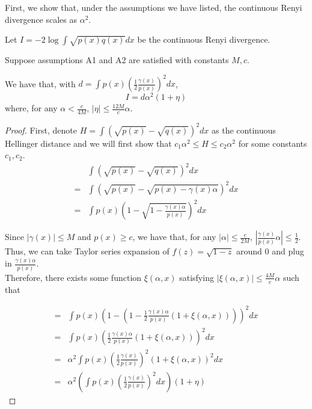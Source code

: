 \documentclass{article}
\begin{document}
First, we show that, under the assumptions we have listed, the continuous Renyi divergence scales as $\alpha^2$. 

\begin{proposition}
\label{prop:continuous_renyi_order}
Let $I = -2 \log \int \sqrt{p(x)q(x)} dx$ be the continuous Renyi divergence.

Suppose assumptions A1 and A2 are satisfied with constants $M, c$. 

We have that, with $d = \int p(x) \left( \frac{1}{2} \frac{\gamma(x)}{p(x)} \right)^2 dx$,
\[
I = d \alpha^2 ( 1 + \eta )
\]
where, for any $\alpha < \frac{c}{4M}$, $|\eta| \leq \frac{12 M}{c} \alpha$. 

\end{proposition}

\begin{proof}

First, denote $H = \int (\sqrt{p(x)} - \sqrt{q(x)})^2 dx$ as the continuous Hellinger distance and we will first show that $c_1 \alpha^2 \leq H \leq c_2 \alpha^2$ for some constants $c_1, c_2$.\\

\begin{align*}
&\int (\sqrt{p(x)} - \sqrt{q(x)})^2 dx \\
=& \int ( \sqrt{p(x)} - \sqrt{p(x) - \gamma(x) \alpha} )^2 dx \\
=& \int p(x) \left( 1 - \sqrt{ 1 - \frac{\gamma(x) \alpha}{p(x)}} \right)^2 dx 
\end{align*}

Since $|\gamma(x)| \leq M$ and $p(x) \geq c$, we have that, for any $|\alpha| \leq \frac{c}{2M}$, $\left| \frac{\gamma(x)}{p(x)} \alpha \right| \leq \frac{1}{2}$. Thus, we can take Taylor series expansion of $f(z) = \sqrt{1 - z}$ around 0 and plug in $\frac{\gamma(x) \alpha}{p(x)}$. \\


Therefore, there exists some function $\xi(\alpha, x)$ satisfying $|\xi(\alpha, x)| \leq 
\frac{4M}{c} \alpha$ such that

\begin{align*}
=& \int p(x) \left( 1 - (1 - \frac{1}{2} \frac{\gamma(x) \alpha}{p(x)} (1 + \xi(\alpha, x)) ) \right)^2 dx \\
=& \int p(x) \left( \frac{1}{2} \frac{\gamma(x) \alpha}{p(x)} (1 + \xi(\alpha, x)) \right)^2 dx\\
=& \alpha^2 \int p(x) \left( \frac{1}{2} \frac{\gamma(x) }{p(x)} \right)^2 (1+\xi(\alpha, x))^2 dx \\
=& \alpha^2 \left( \int p(x) \left( \frac{1}{2} \frac{\gamma(x)}{p(x)} \right)^2 dx \right) (1 + \eta) 
\end{align*}


\end{proof}
\end{document}
